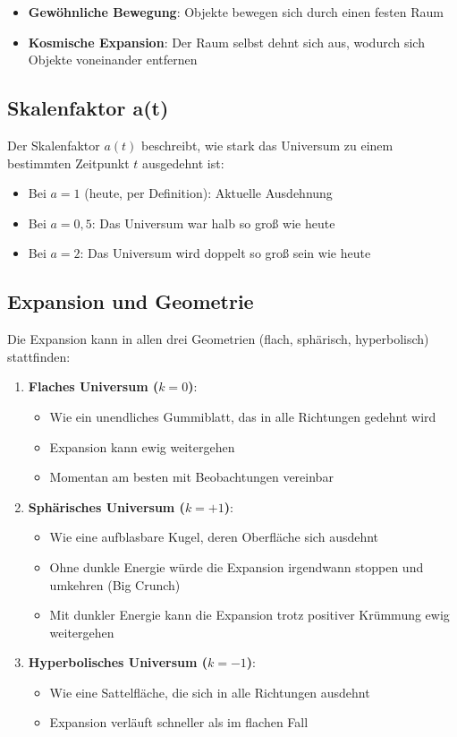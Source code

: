 \documentclass[a4paper,12pt]{article}
\begin{document}
	\begin{itemize}
		\item \textbf{Gewöhnliche Bewegung}: Objekte bewegen sich durch einen festen Raum
		\item \textbf{Kosmische Expansion}: Der Raum selbst dehnt sich aus, wodurch sich Objekte voneinander entfernen
	\end{itemize}
	
	\subsection{Skalenfaktor a(t)}
	
	Der Skalenfaktor $a(t)$ beschreibt, wie stark das Universum zu einem bestimmten Zeitpunkt $t$ ausgedehnt ist:
	
	\begin{itemize}
		\item Bei $a = 1$ (heute, per Definition): Aktuelle Ausdehnung
		\item Bei $a = 0,5$: Das Universum war halb so groß wie heute
		\item Bei $a = 2$: Das Universum wird doppelt so groß sein wie heute
	\end{itemize}
	
	\subsection{Expansion und Geometrie}
	
	Die Expansion kann in allen drei Geometrien (flach, sphärisch, hyperbolisch) stattfinden:
	
	\begin{enumerate}
		\item \textbf{Flaches Universum ($k = 0$)}: 
		\begin{itemize}
			\item Wie ein unendliches Gummiblatt, das in alle Richtungen gedehnt wird
			\item Expansion kann ewig weitergehen
			\item Momentan am besten mit Beobachtungen vereinbar
		\end{itemize}
		
		\item \textbf{Sphärisches Universum ($k = +1$)}:
		\begin{itemize}
			\item Wie eine aufblasbare Kugel, deren Oberfläche sich ausdehnt
			\item Ohne dunkle Energie würde die Expansion irgendwann stoppen und umkehren (Big Crunch)
			\item Mit dunkler Energie kann die Expansion trotz positiver Krümmung ewig weitergehen
		\end{itemize}
		
		\item \textbf{Hyperbolisches Universum ($k = -1$)}:
		\begin{itemize}
			\item Wie eine Sattelfläche, die sich in alle Richtungen ausdehnt
			\item Expansion verläuft schneller als im flachen Fall
		\end{itemize}
	\end{enumerate}
	
\end{document}
